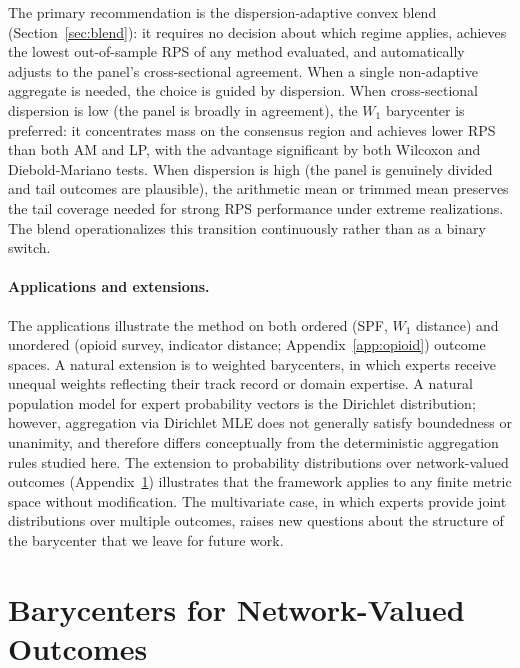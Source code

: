 \begin{remark}
The primary recommendation is the dispersion-adaptive convex blend (Section~\ref{sec:blend}): it requires no decision about which regime applies, achieves the lowest out-of-sample RPS of any method evaluated, and automatically adjusts to the panel's cross-sectional agreement.  When a single non-adaptive aggregate is needed, the choice is guided by dispersion.  When cross-sectional dispersion is low (the panel is broadly in agreement), the $W_1$ barycenter is preferred: it concentrates mass on the consensus region and achieves lower RPS than both AM and LP, with the advantage significant by both Wilcoxon and Diebold-Mariano tests.  When dispersion is high (the panel is genuinely divided and tail outcomes are plausible), the arithmetic mean or trimmed mean preserves the tail coverage needed for strong RPS performance under extreme realizations.  The blend operationalizes this transition continuously rather than as a binary switch.
\end{remark}

\paragraph{Applications and extensions.}  The applications illustrate the method on both ordered (SPF, $W_1$ distance) and unordered (opioid survey, indicator distance; Appendix~\ref{app:opioid}) outcome spaces.  A natural extension is to weighted barycenters, in which experts receive unequal weights reflecting their track record or domain expertise.  A natural population model for expert probability vectors is the Dirichlet distribution; however, aggregation via Dirichlet MLE does not generally satisfy boundedness or unanimity, and therefore differs conceptually from the deterministic aggregation rules studied here.  The extension to probability distributions over network-valued outcomes (Appendix~\ref{app:networks}) illustrates that the framework applies to any finite metric space without modification.  The multivariate case, in which experts provide joint distributions over multiple outcomes, raises new questions about the structure of the barycenter that we leave for future work.

\appendix

\section{Barycenters for Network-Valued Outcomes}
\label{app:networks}

